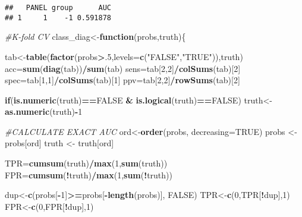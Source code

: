 \documentclass[]{article}
\newenvironment{Shaded}{\begin{snugshade}}{\end{snugshade}}
\newcommand{\CommentTok}[1]{\textcolor[rgb]{0.56,0.35,0.01}{\textit{#1}}}
\newcommand{\ControlFlowTok}[1]{\textcolor[rgb]{0.13,0.29,0.53}{\textbf{#1}}}
\newcommand{\DataTypeTok}[1]{\textcolor[rgb]{0.13,0.29,0.53}{#1}}
\newcommand{\DecValTok}[1]{\textcolor[rgb]{0.00,0.00,0.81}{#1}}
\newcommand{\KeywordTok}[1]{\textcolor[rgb]{0.13,0.29,0.53}{\textbf{#1}}}
\newcommand{\NormalTok}[1]{#1}
\newcommand{\OperatorTok}[1]{\textcolor[rgb]{0.81,0.36,0.00}{\textbf{#1}}}
\newcommand{\OtherTok}[1]{\textcolor[rgb]{0.56,0.35,0.01}{#1}}
\newcommand{\StringTok}[1]{\textcolor[rgb]{0.31,0.60,0.02}{#1}}
\begin{document}
\begin{verbatim}
##   PANEL group      AUC
## 1     1    -1 0.591878
\end{verbatim}

\begin{Shaded}
\begin{Highlighting}[]
\CommentTok{#K-fold CV}
\NormalTok{class_diag<-}\ControlFlowTok{function}\NormalTok{(probs,truth)\{}
  
\NormalTok{  tab<-}\KeywordTok{table}\NormalTok{(}\KeywordTok{factor}\NormalTok{(probs}\OperatorTok{>}\NormalTok{.}\DecValTok{5}\NormalTok{,}\DataTypeTok{levels=}\KeywordTok{c}\NormalTok{(}\StringTok{"FALSE"}\NormalTok{,}\StringTok{"TRUE"}\NormalTok{)),truth)}
\NormalTok{  acc=}\KeywordTok{sum}\NormalTok{(}\KeywordTok{diag}\NormalTok{(tab))}\OperatorTok{/}\KeywordTok{sum}\NormalTok{(tab)}
\NormalTok{  sens=tab[}\DecValTok{2}\NormalTok{,}\DecValTok{2}\NormalTok{]}\OperatorTok{/}\KeywordTok{colSums}\NormalTok{(tab)[}\DecValTok{2}\NormalTok{]}
\NormalTok{  spec=tab[}\DecValTok{1}\NormalTok{,}\DecValTok{1}\NormalTok{]}\OperatorTok{/}\KeywordTok{colSums}\NormalTok{(tab)[}\DecValTok{1}\NormalTok{]}
\NormalTok{  ppv=tab[}\DecValTok{2}\NormalTok{,}\DecValTok{2}\NormalTok{]}\OperatorTok{/}\KeywordTok{rowSums}\NormalTok{(tab)[}\DecValTok{2}\NormalTok{]}

  \ControlFlowTok{if}\NormalTok{(}\KeywordTok{is.numeric}\NormalTok{(truth)}\OperatorTok{==}\OtherTok{FALSE} \OperatorTok{&}\StringTok{ }\KeywordTok{is.logical}\NormalTok{(truth)}\OperatorTok{==}\OtherTok{FALSE}\NormalTok{) truth<-}\KeywordTok{as.numeric}\NormalTok{(truth)}\OperatorTok{-}\DecValTok{1}
  
  \CommentTok{#CALCULATE EXACT AUC}
\NormalTok{  ord<-}\KeywordTok{order}\NormalTok{(probs, }\DataTypeTok{decreasing=}\OtherTok{TRUE}\NormalTok{)}
\NormalTok{  probs <-}\StringTok{ }\NormalTok{probs[ord]}
\NormalTok{  truth <-}\StringTok{ }\NormalTok{truth[ord]}
 
\NormalTok{  TPR=}\KeywordTok{cumsum}\NormalTok{(truth)}\OperatorTok{/}\KeywordTok{max}\NormalTok{(}\DecValTok{1}\NormalTok{,}\KeywordTok{sum}\NormalTok{(truth)) }
\NormalTok{  FPR=}\KeywordTok{cumsum}\NormalTok{(}\OperatorTok{!}\NormalTok{truth)}\OperatorTok{/}\KeywordTok{max}\NormalTok{(}\DecValTok{1}\NormalTok{,}\KeywordTok{sum}\NormalTok{(}\OperatorTok{!}\NormalTok{truth))}
  
\NormalTok{  dup<-}\KeywordTok{c}\NormalTok{(probs[}\OperatorTok{-}\DecValTok{1}\NormalTok{]}\OperatorTok{>=}\NormalTok{probs[}\OperatorTok{-}\KeywordTok{length}\NormalTok{(probs)], }\OtherTok{FALSE}\NormalTok{)}
\NormalTok{  TPR<-}\KeywordTok{c}\NormalTok{(}\DecValTok{0}\NormalTok{,TPR[}\OperatorTok{!}\NormalTok{dup],}\DecValTok{1}\NormalTok{)}
\NormalTok{  FPR<-}\KeywordTok{c}\NormalTok{(}\DecValTok{0}\NormalTok{,FPR[}\OperatorTok{!}\NormalTok{dup],}\DecValTok{1}\NormalTok{)}
  

\end{Highlighting}
\end{Shaded}
\end{document}
